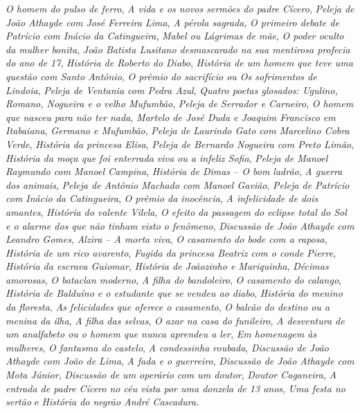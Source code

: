 \textit{O homem do pulso de ferro}, \textit{A vida e os novos sermões do
padre Cícero}, \textit{Peleja de João Athayde com José Ferreira
Lima}, \textit{A pérola sagrada}, \textit{O primeiro debate de Patrício com
Inácio da Catingueira}, \textit{Mabel ou Lágrimas de mãe}, \textit{O poder 
oculto da mulher bonita}, \textit{João Batista Lusitano
desmascarado na sua mentirosa profecia do ano de 17},
\textit{História de Roberto do Diabo}, \textit{História de um homem que
teve uma questão com Santo Antônio}, \textit{O prêmio do sacrifício
ou Os sofrimentos de Lindoia}, \textit{Peleja de Ventania com Pedra
Azul}, \textit{Quatro poetas glosados: Ugulino, Romano, Nogueira
e o velho Mufumbão}, \textit{Peleja de Serrador e Carneiro}, \textit{O
homem que nasceu para não ter nada}, \textit{Martelo de José Duda
e Joaquim Francisco em Itabaiana}, \textit{Germano e Mufumbão},
\textit{Peleja de Laurindo Gato com Marcelino Cobra Verde},
\textit{História da princesa Elisa}, \textit{Peleja de Bernardo Nogueira
com Preto Limão}, \textit{História da moça que foi enterrada viva
ou a infeliz Sofia}, \textit{Peleja de Manoel Raymundo com Manoel
Campina}, \textit{História de Dimas -- O bom ladrão}, \textit{A guerra
dos animais}, \textit{Peleja de Antônio Machado com Manoel
Gavião}, \textit{Peleja de Patrício com Inácio da Catingueira}, \textit{O
prêmio da inocência}, \textit{A infelicidade de dois amantes}, \textit{História
do valente Vilela}, \textit{O efeito da passagem do eclipse total do
Sol e o alarme dos que não tinham visto o fenômeno},
\textit{Discussão de João Athayde com Leandro Gomes}, \textit{Alzira --
A morta viva}, \textit{O casamento do bode com a raposa}, \textit{História
de um rico avarento}, \textit{Fugida da princesa Beatriz com o conde
Pierre}, \textit{História da escrava Guiomar}, \textit{História de Joãozinho
e Mariquinha}, \textit{Décimas amorosas}, \textit{O bataclan moderno}, \textit{A
filha do bandoleiro}, \textit{O casamento do calango}, \textit{História de
Balduíno e o estudante que se vendeu ao diabo}, \textit{História do
menino da floresta}, \textit{As felicidades que oferece o casamento},
\textit{O balcão do destino ou a menina da ilha}, \textit{A filha das selvas},
\textit{O azar na casa do funileiro}, \textit{A desventura de um analfabeto
ou o homem que nunca aprendeu a ler}, \textit{Em homenagem às
mulheres}, \textit{O fantasma do castelo}, \textit{A condessinha roubada},
\textit{Discussão de João Athayde com João de Lima}, \textit{A fada e o
guerreiro}, \textit{Discussão de João Athayde com Mota Júnior},
\textit{Discussão de um operário com um doutor}, \textit{Doutor Caganeira},
\textit{A entrada de padre Cícero no céu vista por uma donzela de
13 anos}, \textit{Uma festa no sertão} e \textit{História do negrão André
Cascadura}.

